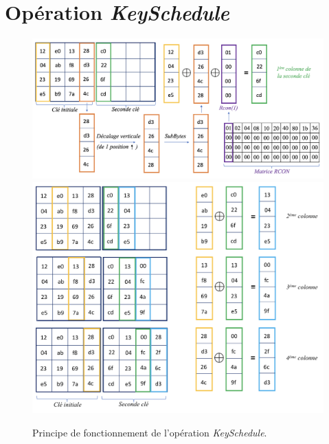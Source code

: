 \documentclass[10pt, oneside, a4paper]{article}
\begin{document}
\section{Opération \textit{KeySchedule}}
\label{ann:KeySchedule}
\begin{figure}[htbp]
    \centering
    \includegraphics[scale=0.45]{image/KeySchedule1}
    \includegraphics[scale=0.65]{image/KeySchedule2}
    \caption{Principe de fonctionnement de l'opération \textit{KeySchedule}.}
    \label{fig:KeySchedule1}
\end{figure}

\newpage


\end{document}

